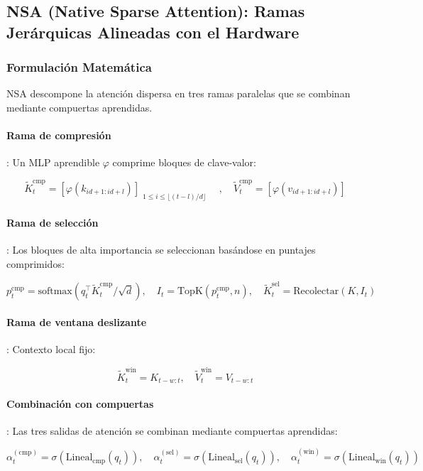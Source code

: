 \documentclass[11pt,a4paper]{article}
\begin{document}
\subsection{NSA (Native Sparse Attention): Ramas Jerárquicas Alineadas con el Hardware}

\subsubsection{Formulación Matemática}

NSA \citep{yuan_nsa_2025} descompone la atención dispersa en tres ramas paralelas que se combinan mediante compuertas aprendidas.

\paragraph{Rama de compresión}: Un MLP aprendible $\varphi$ comprime bloques de clave-valor:

\[
\tilde{K}_t^{\text{cmp}} = \left[\varphi(k_{id+1:id+l})\right]_{\substack{1 \leq i \leq \lfloor(t-l)/d\rfloor}} \quad, \quad \tilde{V}_t^{\text{cmp}} = \left[\varphi(v_{id+1:id+l})\right]
\]

\paragraph{Rama de selección}: Los bloques de alta importancia se seleccionan basándose en puntajes comprimidos:

\[
p_t^{\text{cmp}} = \text{softmax}(q_t^\top \tilde{K}_t^{\text{cmp}} / \sqrt{d}), \quad I_t = \mathrm{TopK}(p_t^{\text{cmp}}, n), \quad \tilde{K}_t^{\text{sel}} = \mathrm{Recolectar}(K, I_t)
\]

\paragraph{Rama de ventana deslizante}: Contexto local fijo:

\[
\tilde{K}_t^{\text{win}} = K_{t-w:t}, \quad \tilde{V}_t^{\text{win}} = V_{t-w:t}
\]

\paragraph{Combinación con compuertas}: Las tres salidas de atención se combinan mediante compuertas aprendidas:

\[
\alpha_t^{(\text{cmp})} = \sigma(\text{Lineal}_\text{cmp}(q_t)), \quad \alpha_t^{(\text{sel})} = \sigma(\text{Lineal}_\text{sel}(q_t)), \quad \alpha_t^{(\text{win})} = \sigma(\text{Lineal}_\text{win}(q_t))
\]
\end{document}
